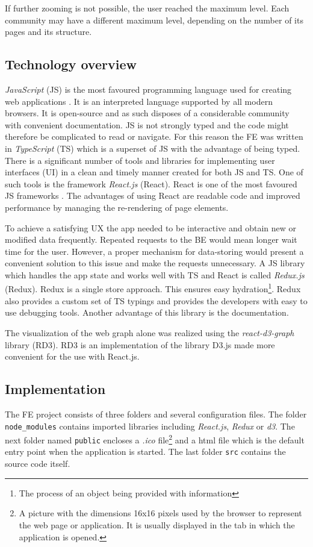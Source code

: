 If further zooming is not possible, the user reached the maximum level. Each community may have a different maximum level, depending on the number of its pages and its structure.

\subsection{Technology overview}
\textit{JavaScript} \cite{javaScript} (JS) is the most favoured programming language used for creating web applications \cite{jsGithut}. It is an interpreted language supported by all modern browsers. It is open-source and as such disposes of a considerable community with convenient documentation. JS is not strongly typed and the code might therefore be complicated to read or navigate. For this reason the FE was written in \textit{TypeScript} (TS) \cite{typeScript} which is a superset of JS with the advantage of being typed. There is a significant number of tools and libraries for implementing user interfaces (UI) in a clean and timely manner created for both JS and TS. One of such tools is the framework \textit{React.js} \cite{react} (React). React is one of the most favoured JS frameworks \cite{reactPopularity}. The advantages of using React are readable code and improved performance by managing the re-rendering of page elements.

To achieve a satisfying UX the app needed to be interactive and obtain new or modified data frequently. Repeated requests to the BE would mean longer wait time for the user. However, a proper mechanism for data-storing would present a convenient solution to this issue and make the requests unnecessary. A JS library which handles the app state and works well with TS and React is called \textit{Redux.js} \cite{redux} (Redux). Redux is a single store approach. This ensures easy hydration\footnote{The process of an object being provided with information}. Redux also provides a custom set of TS typings and provides the developers with easy to use debugging tools. Another advantage of this library is the documentation.

The visualization of the web graph alone was realized using the \textit{react-d3-graph} library \cite{reactD3Graph} (RD3). RD3 is 
an implementation of the library D3.js \cite{d3} made more convenient for the use with React.js. 

\subsection{Implementation}
The FE project consists of three folders and several configuration files. The folder \texttt{node\_modules} contains imported libraries including \textit{React.js}, \textit{Redux} or \textit{d3}. The next folder named \texttt{public} encloses a \textit{.ico} file\footnote {A picture with the dimensions 16x16 pixels used by the browser to represent the web page or application. It is usually displayed in the tab in which the application is opened.} and a html file which is the default entry point when the application is started. The last folder \texttt{src} contains the source code itself. 

